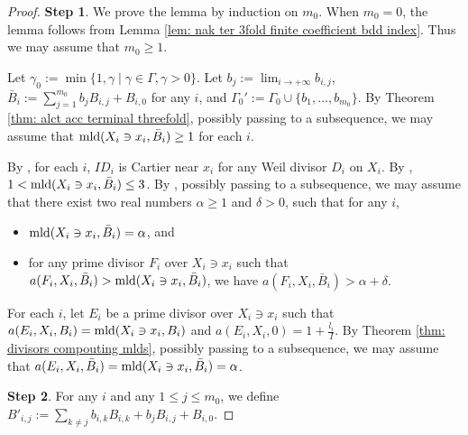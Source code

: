 \documentclass[11pt]{amsart}
\numberwithin{equation}{section}
\newcommand{\mld}{{\rm{mld}}}
\newcommand{\Ii}{{\Gamma}}
\theoremstyle{definition}
\theoremstyle{definition}
\begin{document}
\begin{proof}

\noindent\textbf{Step 1}. 
We prove the lemma by induction on $m_0$. When $m_0=0$, the lemma follows from Lemma \ref{lem: nak ter 3fold finite coefficient bdd index}. Thus we may assume that $m_0\geq 1$. 

Let $\gamma_0:=\min\{1,\gamma\mid \gamma\in\Ii,\gamma>0\}$. Let $b_j:=\lim_{i\rightarrow+\infty}b_{i,j}$, $\bar B_i:=\sum_{j=1}^{m_0}b_jB_{i,j}+B_{i,0}$ for any $i$, and $\Ii_0':=\Ii_0\cup\{b_1,\dots,b_{m_0}\}$. By Theorem \ref{thm: alct acc terminal threefold}, possibly passing to a subsequence, we may assume that $\mld(X_i\ni x_i,\bar B_i)\geq 1$ for each $i$.



By \cite[Lemma~5.1]{Kaw88}, for each $i$, $ID_i$ is Cartier near $x_i$ for any Weil divisor $D_i$ on $X_i$. By \cite[Theorem 0.1]{Amb99}, $1<\mld(X_i\ni x_i,\bar B_i)\leq 3$. By \cite[Theorem 1.2]{Nak16}, possibly passing to a subsequence, we may assume that there exist two real numbers $\alpha\geq 1$ and $\delta>0$, such that for any $i$,  
\begin{itemize}
    \item $\mld(X_i\ni x_i,\bar B_i)=\alpha$, and
    \item for any prime divisor $F_i$ over $X_i\ni x_i$ such that $a(F_i,X_i,\bar B_i)>\mld(X_i\ni x_i,\bar B_i)$, we have $a(F_i,X_i,\bar B_i)>\alpha+\delta$.
\end{itemize}

For each $i$, let $E_i$ be a prime divisor over $X_i\ni x_i$ such that $a(E_i,X_i,B_i)=\mld(X_i\ni x_i,B_i)$ and $a(E_i,X_i,0)=1+\frac{l_i}{I}$. By Theorem \ref{thm: divisors compouting mlds}, possibly passing to a subsequence, we may assume that $a(E_i,X_i,\bar B_i)=\mld(X_i\ni x_i,\bar B_i)=\alpha$.
\medskip

\noindent\textbf{Step 2}. For any $i$ and any $1\leq j\leq m_0$, we define $B'_{i,j}:=\sum_{k\neq j}b_{i,k}B_{i,k}+b_jB_{i,j}+B_{i,0}$.


\end{proof}
\end{document}
